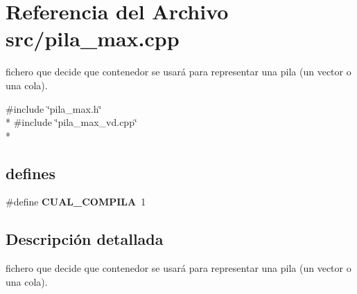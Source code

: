\section{Referencia del Archivo src/pila\+\_\+max.cpp}
\label{pila__max_8cpp}


fichero que decide que contenedor se usará para representar una pila (un vector o una cola).  


{\ttfamily \#include \char`\"{}pila\+\_\+max.\+h\char`\"{}}\\*
{\ttfamily \#include \char`\"{}pila\+\_\+max\+\_\+vd.\+cpp\char`\"{}}\\*
\subsection*{\textquotesingle{}defines\textquotesingle{}}
\begin{DoxyCompactItemize}
\item 
\#define {\bfseries C\+U\+A\+L\+\_\+\+C\+O\+M\+P\+I\+LA}~1\label{pila__max_8cpp_a5ee137079c448f8e19ee449bd929fa1e}

\end{DoxyCompactItemize}


\subsection{Descripción detallada}
fichero que decide que contenedor se usará para representar una pila (un vector o una cola). 

